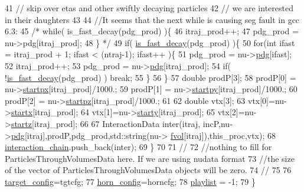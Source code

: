 \begin{DoxyCode}
41       \textcolor{comment}{// skip over etas and other swiftly decaying particles}
42       \textcolor{comment}{// we are interested in their daughters}
43  
44       \textcolor{comment}{//It seems that the next while is causing seg fault in gcc 6.3:}
45       \textcolor{comment}{/*  while( is\_fast\_decay(pdg\_prod) )\{}
46 \textcolor{comment}{          itraj\_prod++;}
47 \textcolor{comment}{          pdg\_prod = nu->pdg[itraj\_prod];}
48 \textcolor{comment}{          \} */}   
49       \textcolor{keywordflow}{if}( \hyperlink{class_neutrino_flux_reweight_1_1_interaction_chain_data_a4297c9ba702c5c205e9624b8bdcc6471}{is\_fast\_decay}(pdg\_prod) )\{
50         \textcolor{keywordflow}{for}(\textcolor{keywordtype}{int} ifast = itraj\_prod + 1; ifast < (ntraj-1); ifast++ )\{
51           pdg\_prod = nu->\hyperlink{classnu__g4numi_a4ed6688aee6debd26637a0401e5ef475}{pdg}[ifast];
52           itraj\_prod++;
53           pdg\_prod = nu->\hyperlink{classnu__g4numi_a4ed6688aee6debd26637a0401e5ef475}{pdg}[itraj\_prod];
54           \textcolor{keywordflow}{if}( !\hyperlink{class_neutrino_flux_reweight_1_1_interaction_chain_data_a4297c9ba702c5c205e9624b8bdcc6471}{is\_fast\_decay}(pdg\_prod) ) \textcolor{keywordflow}{break};      
55         \}
56       \}        
57       \textcolor{keywordtype}{double} prodP[3];
58       prodP[0] = nu->\hyperlink{classnu__g4numi_a309ea4b88683c5978593c0d474b1a976}{startpx}[itraj\_prod]/1000.;
59       prodP[1] = nu->\hyperlink{classnu__g4numi_a5247e8e73a100a7064f032806f542d38}{startpy}[itraj\_prod]/1000.;
60       prodP[2] = nu->\hyperlink{classnu__g4numi_a6bec79e4a2effa3cdaa28a1f02ae8124}{startpz}[itraj\_prod]/1000.;
61       
62       \textcolor{keywordtype}{double} vtx[3];
63       vtx[0]=nu->\hyperlink{classnu__g4numi_ab9ea407b9c38c0c73b606d9f6f4df80a}{startx}[itraj\_prod];
64       vtx[1]=nu->\hyperlink{classnu__g4numi_a58d39dbb466f353155aca6a6e7a2cc12}{starty}[itraj\_prod];
65       vtx[2]=nu->\hyperlink{classnu__g4numi_afc1991c5be450f31577f4e1d31dceb2f}{startz}[itraj\_prod];
66 
67       InteractionData inter(itraj, incP,nu->\hyperlink{classnu__g4numi_a4ed6688aee6debd26637a0401e5ef475}{pdg}[itraj],prodP,pdg\_prod,std::string(nu->
      \hyperlink{classnu__g4numi_a72d170869c1eb191d10366d07024417c}{fvol}[itraj]),this\_proc,vtx);   
68       \hyperlink{class_neutrino_flux_reweight_1_1_interaction_chain_data_a5864063b9c20b4f70e4f1e355df21963}{interaction\_chain}.push\_back(inter);
69     \}
70     
71     \textcolor{comment}{//}
72     \textcolor{comment}{//nothing to fill for ParticlesThroughVolumesData here. If we are using nudata format}
73     \textcolor{comment}{//the size of the vector of ParticlesThroughVolumesData objects will be zero.}
74     \textcolor{comment}{//    }
75 
76     \hyperlink{class_neutrino_flux_reweight_1_1_interaction_chain_data_a8362a0f94df2bd321e0b60a38c41fb7a}{target\_config}=tgtcfg;
77     \hyperlink{class_neutrino_flux_reweight_1_1_interaction_chain_data_a343d6a28ec2d41252a6067833b75f831}{horn\_config}=horncfg;
78     \hyperlink{class_neutrino_flux_reweight_1_1_interaction_chain_data_aca185ce4c11a46ea16b29a55ff97a490}{playlist} = -1;
79   \}
\end{DoxyCode}
